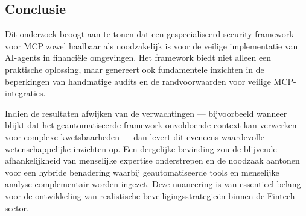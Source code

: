 \subsection{Conclusie}
Dit onderzoek beoogt aan te tonen dat een gespecialiseerd security framework voor MCP zowel haalbaar als noodzakelijk is voor de veilige implementatie van AI-agents in financiële omgevingen. Het framework biedt niet alleen een praktische oplossing, maar genereert ook fundamentele inzichten in de beperkingen van handmatige audits en de randvoorwaarden voor veilige MCP-integraties.

Indien de resultaten afwijken van de verwachtingen — bijvoorbeeld wanneer blijkt dat het geautomatiseerde framework onvoldoende context kan verwerken voor complexe kwetsbaarheden — dan levert dit eveneens waardevolle wetenschappelijke inzichten op. Een dergelijke bevinding zou de blijvende afhankelijkheid van menselijke expertise onderstrepen en de noodzaak aantonen voor een hybride benadering waarbij geautomatiseerde tools en menselijke analyse complementair worden ingezet. Deze nuancering is van essentieel belang voor de ontwikkeling van realistische beveiligingsstrategieën binnen de Fintech-sector.



%
%
%
